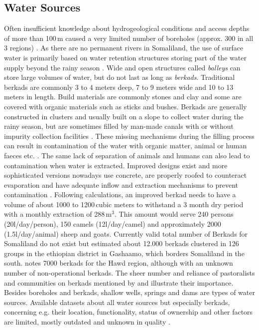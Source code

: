 \subsection{Water Sources}

Often insufficient knowledge about hydrogeological conditions and access depths of more than 100\,m caused a very limited number of boreholes (approx. 300 in all 3 regions) \autocite{faoswalimHydrogeologicalSurveyAssessment2012, petrucciLandscapeLandformsNorthern2022,salemTerritorialDiagnosticReport2016}. As there are no permanent rivers in Somaliland, the use of surface water is primarily based on water retention structures storing part of the water supply beyond the rainy season \autocite{petrucciLandscapeLandformsNorthern2022}. Wide and open structures called \textit{balleys} can store large volumes of water, but do not last as long as \textit{berkads}.
Traditional berkads are commonly 3 to 4 meters deep, 7 to 9 meters wide and 10 to 13 meters in length. Build materials are commonly stones and clay and some are covered with organic materials such as sticks and bushes. Berkads are generally constructed in clusters and usually built on a slope to collect water during the rainy season, but are sometimes filled by man-made canals with or without impurity collection facilities \autocite{walkerChangingPastoralismEthiopian1998}. These missing mechanisms during the filling process can result in contamination of the water with organic matter, animal or human faeces etc. \autocite{mercycorpsIMPROVEDBERKADDESIGNS2017}. The same lack of separation of animals and humans can also lead to contamination when water is extracted. Improved designs exist and more sophisticated versions nowadays use concrete, are properly roofed to counteract evaporation and have adequate inflow and extraction mechanisms to prevent contamination \autocite{mercycorpsIMPROVEDBERKADDESIGNS2017, petrucciLandscapeLandformsNorthern2022}. Following \autocite{mercycorpsIMPROVEDBERKADDESIGNS2017} calculations, an improved berkad needs to have a volume of about 1000 to 1200\,cubic meters to  withstand a 3 month dry period with a monthly extraction of 288\,m$^3$. This amount would serve 240 persons (20l/day/person), 150 camels (12l/day/camel) and approximately 2000 (1.5l/day/animal) sheep and goats. Currently valid total number of Berkads for Somaliland do not exist but \autocite{walkerChangingPastoralismEthiopian1998} estimated about 12.000 berkads clustered in 126 groups in the ethiopian district in Gashaamo, which borders Somaliland in the south. \autocite{birchWeUsedSing2008} notes 7000 berkads for the Hawd region, although with an unknown number of non-operational berkads. The sheer number and reliance of pastoralists and communities on berkads mentioned by \autocite{walkerChangingPastoralismEthiopian1998} and \autocite{birchSomalilandSomaliRegion2008} illustrate their importance. Besides boreholes and berkads, shallow wells, springs and dams are types of water sources. Available datasets about all water sources but especially berkads, concerning e.g. their location, functionality, status of ownership and other factors are limited, mostly outdated and unknown in quality \autocite{FAOSWALIMSomalia}. 

